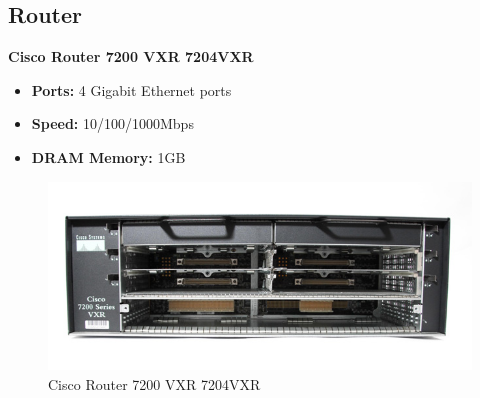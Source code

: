  \subsection{Router}
 \textbf{Cisco Router 7200 VXR 7204VXR}
 \begin{itemize}
  	\item \textbf{Ports:} 4 Gigabit Ethernet ports
  	\item \textbf{Speed:} 10/100/1000Mbps
  	\item \textbf{DRAM Memory:} 1GB 
 \end{itemize}
 \begin{figure}[htbp]
	\begin{center}
        \includegraphics[scale = 0.5]{img/router.jpg}
        \caption{Cisco Router 7200 VXR 7204VXR}
    \end{center}
\end{figure}


\newpage
